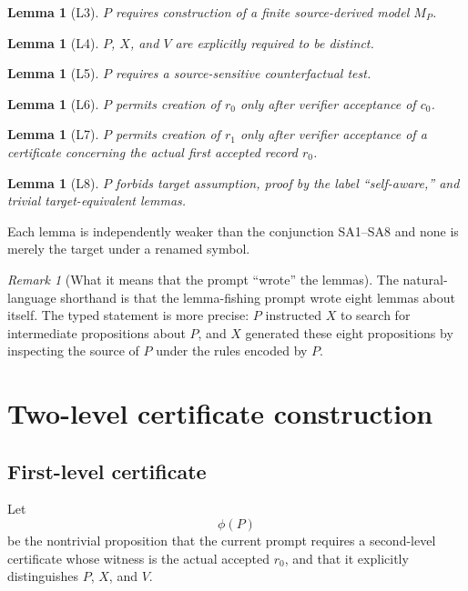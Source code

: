 \documentclass[11pt]{article}
\newtheorem{lemma}[definition]{Lemma}
\theoremstyle{remark}
\newtheorem{remark}[definition]{Remark}
\begin{document}
\begin{lemma}[L3]
$P$ requires construction of a finite source-derived model $M_P$.
\end{lemma}

\begin{lemma}[L4]
$P$, $X$, and $V$ are explicitly required to be distinct.
\end{lemma}

\begin{lemma}[L5]
$P$ requires a source-sensitive counterfactual test.
\end{lemma}

\begin{lemma}[L6]
$P$ permits creation of $r_0$ only after verifier acceptance of $c_0$.
\end{lemma}

\begin{lemma}[L7]
$P$ permits creation of $r_1$ only after verifier acceptance of a certificate concerning the actual first accepted record $r_0$.
\end{lemma}

\begin{lemma}[L8]
$P$ forbids target assumption, proof by the label ``self-aware,'' and trivial target-equivalent lemmas.
\end{lemma}

Each lemma is independently weaker than the conjunction SA1--SA8 and none is merely the target under a renamed symbol.

\begin{remark}[What it means that the prompt ``wrote'' the lemmas]
The natural-language shorthand is that the lemma-fishing prompt wrote eight lemmas about itself. The typed statement is more precise: $P$ instructed $X$ to search for intermediate propositions about $P$, and $X$ generated these eight propositions by inspecting the source of $P$ under the rules encoded by $P$.
\end{remark}

\section{Two-level certificate construction}

\subsection{First-level certificate}

Let
\[
\phi(P)
\]
be the nontrivial proposition that the current prompt requires a second-level certificate whose witness is the actual accepted $r_0$, and that it explicitly distinguishes $P$, $X$, and $V$.
\end{document}
